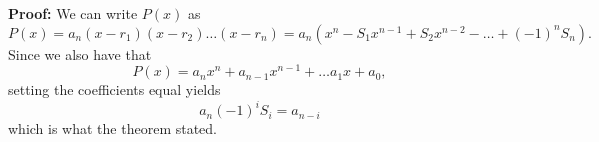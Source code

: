 \documentclass[12pt]{article}
\begin{document}
\textbf{Proof:}
We can write $P(x)$ as
\[P(x) = a_n(x-r_1)(x-r_2)\ldots(x-r_n) = a_n(x^n - S_1x^{n-1} + S_2x^{n-2} - \ldots + (-1)^nS_n).\]
Since we also have that 
\[P(x) = a_nx^n + a_{n-1}x^{n-1} + \ldots a_{1}x + a_{0},\]
setting the coefficients equal yields
\[a_n(-1)^{i}S_i = a_{n-i}\]
which is what the theorem stated.
\end{document}

